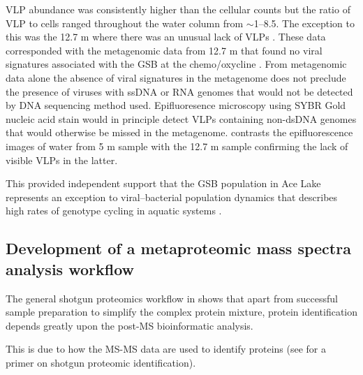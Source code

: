 \ac{VLP} abundance was consistently higher than the cellular counts but the ratio of \ac{VLP} to cells ranged throughout the water column from $\sim$1--8.5.
The exception to this was the 12.7 m where there was an unusual lack of \acp{VLP} .
These data corresponded with the metagenomic data from 12.7 m that found no viral signatures associated with the \ac{GSB} at the chemo/oxycline \cite{Lauro2011}.
From metagenomic data alone the absence of viral signatures in the metagenome does not preclude the presence of viruses with ss\textsc{DNA} or \textsc{RNA} genomes that would not be detected by \textsc{DNA} sequencing method used.
Epifluoresence microscopy using SYBR Gold nucleic acid stain would in principle detect \acp{VLP} containing non-dsDNA genomes \cite{Patel2007} that would otherwise be missed in the metagenome.
 contrasts the epifluorescence images of water from 5 m sample with the 12.7 m sample confirming the lack of visible \acp{VLP} in the latter.

This provided independent support that the \ac{GSB} population in Ace Lake represents an exception to viral--bacterial population dynamics that describes high rates of genotype cycling in aquatic systems \cite{Rodriguez-Brito2010}.



\subsection[Development of a metaproteomic mass spectra analysis workflow ]{Development of a metaproteomic mass spectra analysis workflow }

The general shotgun proteomics workflow in  shows that apart from successful sample preparation to simplify the complex protein mixture, protein identification depends greatly upon the post-\ac{MS} bioinformatic analysis.

This is due to how the \ac{MS-MS} data are used to identify proteins (see \citet{Marcotte2007} for a primer on shotgun proteomic identification).

